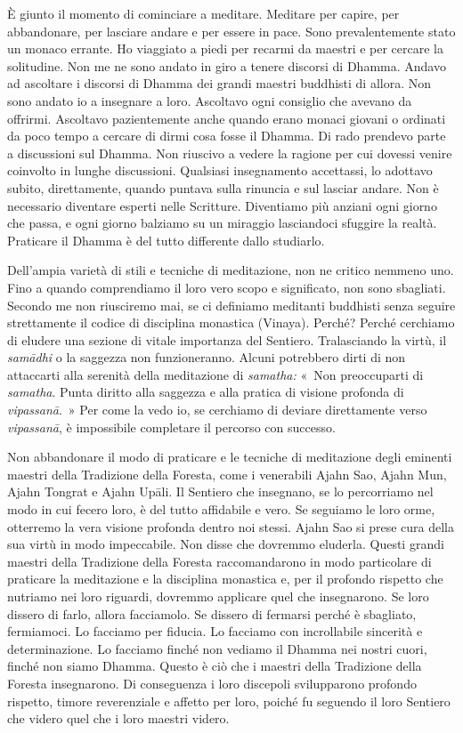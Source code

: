 È giunto il momento di cominciare a meditare. Meditare per capire, per
abbandonare, per lasciare andare e per essere in pace. Sono
prevalentemente stato un monaco errante. Ho viaggiato a piedi per
recarmi da maestri e per cercare la solitudine. Non me ne sono andato in
giro a tenere discorsi di Dhamma. Andavo ad ascoltare i discorsi di
Dhamma dei grandi maestri buddhisti di allora. Non sono andato io a
insegnare a loro. Ascoltavo ogni consiglio che avevano da offrirmi.
Ascoltavo pazientemente anche quando erano monaci giovani o ordinati da
poco tempo a cercare di dirmi cosa fosse il Dhamma. Di rado prendevo
parte a discussioni sul Dhamma. Non riuscivo a vedere la ragione per cui
dovessi venire coinvolto in lunghe discussioni. Qualsiasi insegnamento
accettassi, lo adottavo subito, direttamente, quando puntava sulla
rinuncia e sul lasciar andare. Non è necessario diventare esperti nelle
Scritture. Diventiamo più anziani ogni giorno che passa, e ogni giorno
balziamo su un miraggio lasciandoci sfuggire la realtà. Praticare il
Dhamma è del tutto differente dallo studiarlo.

Dell'ampia varietà di stili e tecniche di meditazione, non ne critico
nemmeno uno. Fino a quando comprendiamo il loro vero scopo e
significato, non sono sbagliati. Secondo me non riusciremo mai, se ci
definiamo meditanti buddhisti senza seguire strettamente il codice di
disciplina monastica (Vinaya). Perché? Perché cerchiamo di eludere una
sezione di vitale importanza del Sentiero. Tralasciando la virtù, il
\emph{samādhi} o la saggezza non funzioneranno. Alcuni potrebbero dirti
di non attaccarti alla serenità della meditazione di \emph{samatha:}
«~Non preoccuparti di \emph{samatha}. Punta diritto alla saggezza e alla
pratica di visione profonda di \emph{vipassanā}.~» Per come la vedo io,
se cerchiamo di deviare direttamente verso \emph{vipassanā}, è
impossibile completare il percorso con successo.

Non abbandonare il modo di praticare e le tecniche di meditazione degli
eminenti maestri della Tradizione della Foresta, come i venerabili Ajahn
Sao, Ajahn Mun, Ajahn Tongrat e Ajahn Upāli. Il Sentiero che insegnano,
se lo percorriamo nel modo in cui fecero loro, è del tutto affidabile e
vero. Se seguiamo le loro orme, otterremo la vera visione profonda
dentro noi stessi. Ajahn Sao si prese cura della sua virtù in modo
impeccabile. Non disse che dovremmo eluderla. Questi grandi maestri
della Tradizione della Foresta raccomandarono in modo particolare di
praticare la meditazione e la disciplina monastica e, per il profondo
rispetto che nutriamo nei loro riguardi, dovremmo applicare quel che
insegnarono. Se loro dissero di farlo, allora facciamolo. Se dissero di
fermarsi perché è sbagliato, fermiamoci. Lo facciamo per fiducia. Lo
facciamo con incrollabile sincerità e determinazione. Lo facciamo finché
non vediamo il Dhamma nei nostri cuori, finché non siamo Dhamma. Questo
è ciò che i maestri della Tradizione della Foresta insegnarono. Di
conseguenza i loro discepoli svilupparono profondo rispetto, timore
reverenziale e affetto per loro, poiché fu seguendo il loro Sentiero che
videro quel che i loro maestri videro.

